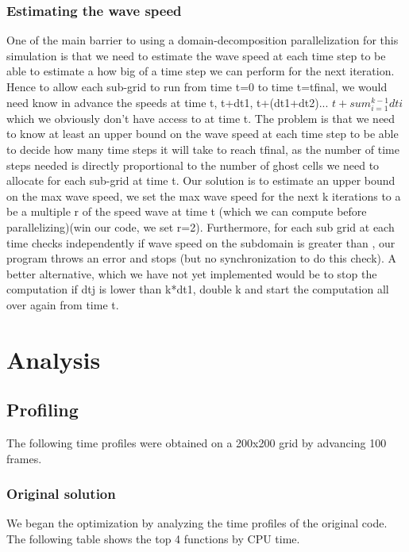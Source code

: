 \documentclass[11pt]{article}
\begin{document}
\subsubsection{Estimating the wave speed}
One of the main barrier to using a domain-decomposition parallelization for this simulation is that we need to estimate the wave speed at each time step to be able to estimate a how big of a time step we can perform for the next iteration. Hence to allow each sub-grid to run from time t=0 to time t=tfinal, we would need know in advance the speeds at time t, t+dt1, t+(dt1+dt2)... $t+sum_{i=1}^{k-1}dti$ which we obviously don't have access to at time t. The problem is that we need to know at least an upper bound on the wave speed at each time step to be able to decide how many time steps it will take to reach tfinal, as the number of time steps needed is directly proportional to the number of ghost cells we need to allocate for each sub-grid at time t. Our solution is to estimate an upper bound on the max wave speed, we set the max wave speed for the next k iterations to a be a multiple r of the speed wave at time t (which we can compute before parallelizing)(win our code, we set r=2). Furthermore, for each sub grid at each time checks independently if wave speed on the subdomain is greater than , our program throws an error and stops (but no synchronization to do this check). A better alternative, which we have not yet implemented would be to stop the computation if dtj is lower than k*dt1, double k and start the computation all over again from time t.


\section{Analysis}
\subsection{Profiling} \label{sec:prof}

The following time profiles were obtained on a 200x200 grid by advancing 100 frames. 

\subsubsection{Original solution}
We began the optimization by analyzing the time profiles of the original code. The following table shows the top 4 functions by CPU time. 

\end{document}
